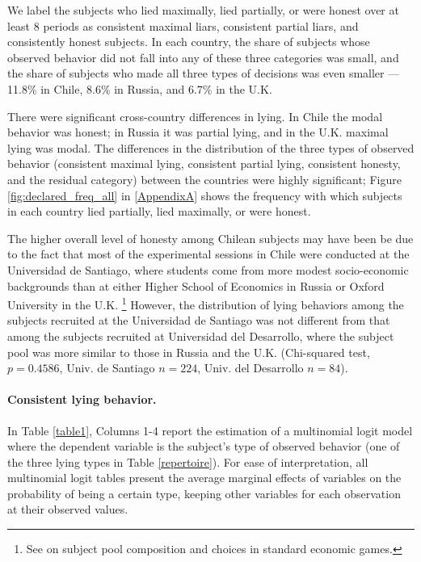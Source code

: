 \documentclass[12pt]{article}
\begin{document}
\par We label the subjects who lied maximally, lied partially, or were honest over at least 8 periods as consistent maximal liars, consistent partial liars, and consistently honest subjects. In each country, the share of subjects whose observed behavior did not fall into any of these three categories was small, and the share of subjects who made all three types of decisions was even smaller --- 11.8\% in Chile, 8.6\% in Russia, and 6.7\% in the U.K.

\par There were significant cross-country differences in lying. In Chile the modal behavior was honest; in Russia it was partial lying, and in the U.K. maximal lying was modal. The differences in the distribution of the three types of observed behavior (consistent maximal lying, consistent partial lying, consistent honesty, and the residual category) between the countries were highly significant\footnotemark{}; Figure \ref{fig:declared_freq_all} in \ref{AppendixA} shows the frequency with which subjects in each country lied partially, lied maximally, or were honest. 
 

\par The higher overall level of honesty among Chilean subjects may have been be due to the fact that most of the experimental sessions in Chile were conducted at the Universidad de Santiago, where students come from more modest socio-economic backgrounds than at either Higher School of Economics in Russia or Oxford University in the U.K. \footnote{See \citet{Belotetal2015} on subject pool composition and choices in standard economic games.} However, the distribution of lying behaviors among the subjects recruited at the Universidad de Santiago was not different from that among the subjects recruited at Universidad del Desarrollo, where the subject pool was more similar to those in Russia and the U.K. (Chi-squared test, $p=0.4586$, Univ. de Santiago $n=224$, Univ. del Desarrollo $n=84$). 
\label{stata:chile_udd}

\paragraph{Consistent lying behavior.} In Table \ref{table1}, Columns 1-4 report the estimation of a multinomial logit model where the dependent variable is the subject's type of observed behavior (one of the three lying types in Table \ref{repertoire}). For ease of interpretation, all multinomial logit tables present the average marginal effects of variables on the probability of being a certain type, keeping other variables for each observation at their observed values.  
\end{document}
